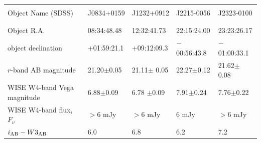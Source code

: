 \begin{table}
\begin{center}
\begin{tabular}{||  l|l|l|l|l ||}
  \hline\hline
  &&&& \\
  Object Name (SDSS)        & J0834+0159         &  J1232+0912          & J2215-0056        & J2323-0100 \\
  &&&& \\
  \hline
  &&&& \\
  Object R.A.                             & 08:34:48.48         & 12:32:41.73           & 22:15:24.00          & 23:23:26.17     \\
  object declination                  & $+$01:59:21.1     & $+$09:12:09.3      & $-$00:56:43.8      & $-$01:00:33.1  \\
  $r$-band AB magnitude         & 21.20$\pm$0.05  & 21.11$\pm$ 0.05  & 22.27$\pm$0.12  & 21.62$\pm$ 0.08 \\  
  WISE W4-band Vega magnitude & 6.88$\pm$0.09  & 6.78 $\pm$0.09   & 7.91$\pm$0.24  & 7.76$\pm$0.22 \\  
  WISE W4-band flux, $F_{\nu}$   & $>$6 mJy             & $>$6 mJy              & 6 mJy                 & $>$6 mJy  \\ 
  $i_{\rm AB}-W3_{\rm AB}$            & 6.0                        & 6.8                        & 6.2                        & 7.2\\


\end{tabular}
\end{center}
\end{table}
